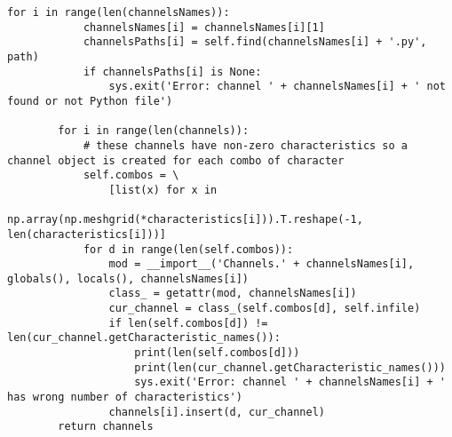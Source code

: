 \begin{lstlisting}[breaklines]
        for i in range(len(channelsNames)):
            channelsNames[i] = channelsNames[i][1]
            channelsPaths[i] = self.find(channelsNames[i] + '.py', path)
            if channelsPaths[i] is None:
                sys.exit('Error: channel ' + channelsNames[i] + ' not found or not Python file')

        for i in range(len(channels)):
            # these channels have non-zero characteristics so a channel object is created for each combo of character
            self.combos = \
                [list(x) for x in
                 np.array(np.meshgrid(*characteristics[i])).T.reshape(-1, len(characteristics[i]))]
            for d in range(len(self.combos)):
                mod = __import__('Channels.' + channelsNames[i], globals(), locals(), channelsNames[i])
                class_ = getattr(mod, channelsNames[i])
                cur_channel = class_(self.combos[d], self.infile)
                if len(self.combos[d]) != len(cur_channel.getCharacteristic_names()):
                    print(len(self.combos[d]))
                    print(len(cur_channel.getCharacteristic_names()))
                    sys.exit('Error: channel ' + channelsNames[i] + ' has wrong number of characteristics')
                channels[i].insert(d, cur_channel)
        return channels

\end{lstlisting}

